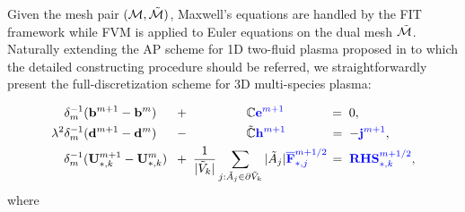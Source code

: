 \documentclass{article}
\begin{document}
Given the mesh pair $(\mathcal{M}, \Tilde{\mathcal{M}})$, Maxwell's equations are handled by the FIT framework while FVM is applied to Euler equations on the dual mesh 
$\Tilde{\mathcal{M}}$. Naturally extending the AP scheme for 1D two-fluid plasma proposed in \cite{degond_2012} to which the detailed constructing procedure should be referred, we straightforwardly present the full-discretization scheme for 3D multi-species plasma:

\begin{align}
    \delta_m^{-1} (\mathbf{b}^{m+1} - \mathbf{b}^{m}) \hspace{0.4cm}&\;+\; \hspace{1.5cm}\mathbb{C}\textcolor{blue}{\mathbf{e}^{m+1}}\hspace{1.25cm}=\; 0, \label{equ:maxwell_faraday_ap}\\
    \lambda^2\delta_m^{-1}(\mathbf{d}^{m+1} - \mathbf{d}^m) \hspace{0.4cm}&\;-\; \hspace{1.5cm}\Tilde{\mathbb{C}}\textcolor{blue}{\mathbf{h}^{m+1}} \hspace{1.22cm}=\; - \textcolor{blue}{\mathbf{j}^{m+1}}, \label{equ:maxwell_ampere_ap}\\
    \delta_m^{-1}(\mathbf{U}_{*,k}^{m+1} - \mathbf{U}_{*,k}^{m}) \hspace{0.10cm}&\;+\;  \frac{1}{|\Tilde{V}_k|}\sum_{j:\Tilde{A}_j\in\partial\Tilde{V}_k}|\Tilde{A}_j|\textcolor{blue}{\overline{\mathbf{F}}_{*,j}^{m+1/2}} \hspace{0.05cm}=\; \textcolor{blue}{\mathbf{RHS}_{*,k}^{m+1/2}}, \label{equ:euler_ap}
\end{align}
where 
\end{document}
